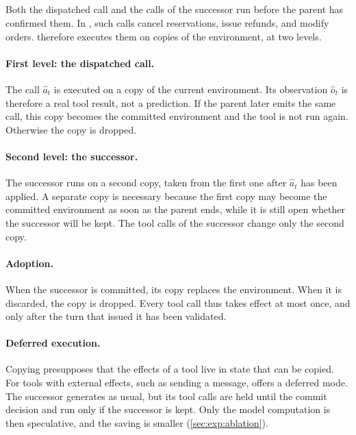 \subsection{\stratSandbox}
\label{sec:method:sandbox}

Both the dispatched call and the calls of the successor run before the parent has confirmed them.
In \taubench, such calls cancel reservations, issue refunds, and modify orders.
\method therefore executes them on copies of the environment, at two levels.

\paragraph{First level: the dispatched call.}
The call $\hat a_t$ is executed on a copy of the current environment.
Its observation $\hat o_t$ is therefore a real tool result, not a prediction.
If the parent later emits the same call, this copy becomes the committed environment and the tool is not run again.
Otherwise the copy is dropped.

\paragraph{Second level: the successor.}
The successor runs on a second copy, taken from the first one after $\hat a_t$ has been applied.
A separate copy is necessary because the first copy may become the committed environment as soon as the parent ends, while it is still open whether the successor will be kept.
The tool calls of the successor change only the second copy.

\paragraph{Adoption.}
When the successor is committed, its copy replaces the environment.
When it is discarded, the copy is dropped.
Every tool call thus takes effect at most once, and only after the turn that issued it has been validated.

\paragraph{Deferred execution.}
Copying presupposes that the effects of a tool live in state that can be copied.
For tools with external effects, such as sending a message, \method offers a deferred mode.
The successor generates as usual, but its tool calls are held until the commit decision and run only if the successor is kept.
Only the model computation is then speculative, and the saving is smaller (\cref{sec:exp:ablation}).


